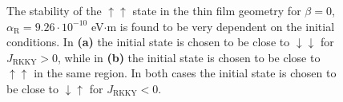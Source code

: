 \begin{figure}[h!]
\begin{subfigure}{.49\textwidth}
  \caption{}
  \label{fig:StabilityUU}
\end{subfigure}

\caption{The stability of the $\uparrow\uparrow$ state in the thin film geometry for $\beta = 0$, $\alpha_\text{R} = 9.26\cdot10^{-10}$ eV$\cdot$m is found to be very dependent on the initial conditions. In \textbf{(a)} the initial state is chosen to be close to $\downarrow\downarrow$ for $J_{\text{RKKY}}>0$, while in \textbf{(b)} the initial state is chosen to be close to $\uparrow\uparrow$ in the same region. In both cases the initial state is chosen to be close to $\downarrow\uparrow$ for $J_{\text{RKKY}}<0$.}
\label{fig:STOFilmStability}
\end{figure}

